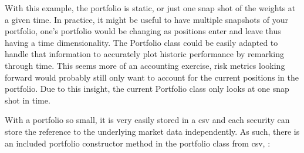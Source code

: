 \documentclass[letterpaper,10pt,english]{sphinxmanual}
\begin{document}
With this example, the portfolio is static, or just one snap shot of the
weights at a given time. In practice, it might be useful to have
multiple snapshots of your portfolio, one’s portfolio would be changing
as positions enter and leave thus having a time dimensionality. The
Portfolio class could be easily adapted to handle that information to
accurately plot historic performance by remarking through time. This
seems more of an accounting exercise, risk metrics looking forward would
probably still only want to account for the current positions in the
portfolio. Due to this insight, the current Portfolio class only looks
at one snap shot in time.

With a portfolio so small, it is very easily stored in a csv and each
security can store the reference to the underlying market data
independently. As such, there is an included portfolio constructor
method in the portfolio class from csv, :

%
\begin{sphinxVerbatim}[commandchars=\\\{\}]
   
  
  
\PYG{p}{[}\PYG{p}{]}
\end{sphinxVerbatim}
\end{document}
